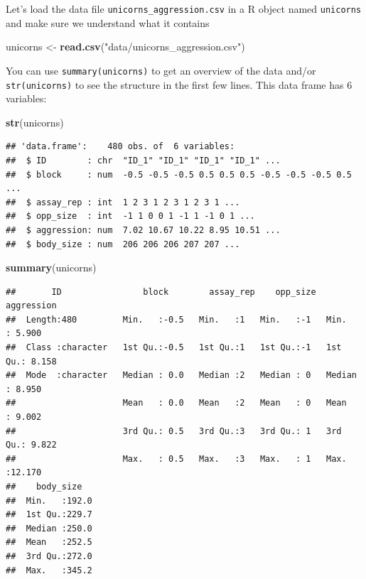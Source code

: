 \documentclass[
  12pt,
]{book}
\newenvironment{Shaded}{\begin{snugshade}}{\end{snugshade}}
\newcommand{\KeywordTok}[1]{\textcolor[rgb]{0.13,0.29,0.53}{\textbf{#1}}}
\newcommand{\NormalTok}[1]{#1}
\newcommand{\StringTok}[1]{\textcolor[rgb]{0.31,0.60,0.02}{#1}}
\begin{document}
Let's load the data file \texttt{unicorns\_aggression.csv} in a R object named \texttt{unicorns} and make sure we understand what it contains

\begin{Shaded}
\begin{Highlighting}[]
\NormalTok{unicorns <-}\StringTok{ }\KeywordTok{read.csv}\NormalTok{(}\StringTok{"data/unicorns_aggression.csv"}\NormalTok{)}
\end{Highlighting}
\end{Shaded}

You can use \texttt{summary(unicorns)} to get an overview of the data and/or \texttt{str(unicorns)} to see the structure in the first few lines. This data frame has 6 variables:

\begin{Shaded}
\begin{Highlighting}[]
\KeywordTok{str}\NormalTok{(unicorns)}
\end{Highlighting}
\end{Shaded}

\begin{verbatim}
## 'data.frame':    480 obs. of  6 variables:
##  $ ID        : chr  "ID_1" "ID_1" "ID_1" "ID_1" ...
##  $ block     : num  -0.5 -0.5 -0.5 0.5 0.5 0.5 -0.5 -0.5 -0.5 0.5 ...
##  $ assay_rep : int  1 2 3 1 2 3 1 2 3 1 ...
##  $ opp_size  : int  -1 1 0 0 1 -1 1 -1 0 1 ...
##  $ aggression: num  7.02 10.67 10.22 8.95 10.51 ...
##  $ body_size : num  206 206 206 207 207 ...
\end{verbatim}

\begin{Shaded}
\begin{Highlighting}[]
\KeywordTok{summary}\NormalTok{(unicorns)}
\end{Highlighting}
\end{Shaded}

\begin{verbatim}
##       ID                block        assay_rep    opp_size    aggression    
##  Length:480         Min.   :-0.5   Min.   :1   Min.   :-1   Min.   : 5.900  
##  Class :character   1st Qu.:-0.5   1st Qu.:1   1st Qu.:-1   1st Qu.: 8.158  
##  Mode  :character   Median : 0.0   Median :2   Median : 0   Median : 8.950  
##                     Mean   : 0.0   Mean   :2   Mean   : 0   Mean   : 9.002  
##                     3rd Qu.: 0.5   3rd Qu.:3   3rd Qu.: 1   3rd Qu.: 9.822  
##                     Max.   : 0.5   Max.   :3   Max.   : 1   Max.   :12.170  
##    body_size    
##  Min.   :192.0  
##  1st Qu.:229.7  
##  Median :250.0  
##  Mean   :252.5  
##  3rd Qu.:272.0  
##  Max.   :345.2
\end{verbatim}
\end{document}
